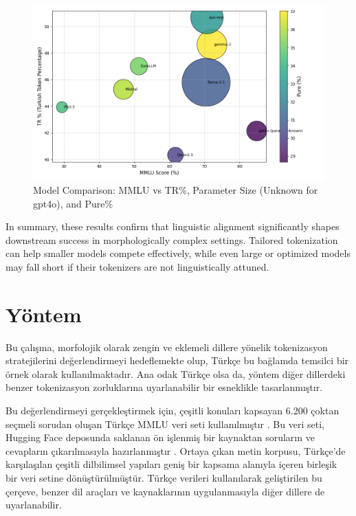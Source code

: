 \begin{figure}[h!]
    \centering
    \includegraphics[width=1\textwidth]{model_comparison.png}
    \caption{
    Model Comparison: MMLU vs TR\%, Parameter Size (Unknown for gpt4o), and Pure\%
    }
    \label{fig:model_comparison}
\end{figure}

In summary, these results confirm that linguistic alignment significantly shapes downstream success in morphologically complex settings. Tailored tokenization can help smaller models compete effectively, while even large or optimized models may fall short if their tokenizers are not linguistically attuned.

\section{Yöntem}

Bu çalışma, morfolojik olarak zengin ve eklemeli dillere yönelik tokenizasyon stratejilerini değerlendirmeyi hedeflemekte olup, Türkçe bu bağlamda temsilci bir örnek olarak kullanılmaktadır. Ana odak Türkçe olsa da, yöntem diğer dillerdeki benzer tokenizasyon zorluklarına uyarlanabilir bir esneklikle tasarlanmıştır.

Bu değerlendirmeyi gerçekleştirmek için, çeşitli konuları kapsayan 6.200 çoktan seçmeli sorudan oluşan Türkçe MMLU veri seti kullanılmıştır \cite{bayram_turkish_nodate}. Bu veri seti, Hugging Face deposunda saklanan ön işlenmiş bir kaynaktan soruların ve cevapların çıkarılmasıyla hazırlanmıştır \cite{bayram_turkish_nodate}. Ortaya çıkan metin korpusu, Türkçe'de karşılaşılan çeşitli dilbilimsel yapıları geniş bir kapsama alanıyla içeren birleşik bir veri setine dönüştürülmüştür. Türkçe verileri kullanılarak geliştirilen bu çerçeve, benzer dil araçları ve kaynaklarının uygulanmasıyla diğer dillere de uyarlanabilir.

